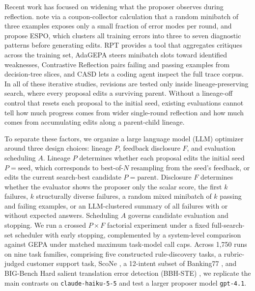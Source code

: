 \documentclass[10pt]{article}
\begin{document}
Recent work has focused on widening what the proposer observes during
reflection. \citet{liu2026espo} note via a coupon-collector calculation
that a random minibatch of three examples exposes only a small fraction
of error modes per round, and propose ESPO, which clusters all training
errors into three to seven diagnostic patterns before generating edits.
RPT \citep{bayat2026reflective} provides a tool that aggregates
critiques across the training set, AdaGEPA \citep{chen2026adagepa}
steers minibatch slots toward identified weaknesses, Contrastive
Reflection \citep{koh2026contrastive} pairs failing and passing examples
from decision-tree slices, and CASD \citep{singh2026coding} lets a
coding agent inspect the full trace corpus. In all of these iterative
studies, revisions are tested only inside lineage-preserving search,
where every proposal edits a surviving parent. Without a lineage-off
control that resets each proposal to the initial seed, existing
evaluations cannot tell how much progress comes from wider single-round
reflection and how much comes from accumulating edits along a
parent-child lineage.

To separate these factors, we organize a large language model (LLM)
optimizer around three design choices: lineage \(P\), feedback
disclosure \(F\), and evaluation scheduling \(A\). Lineage \(P\)
determines whether each proposal edits the initial seed
\(P = \text{seed}\), which corresponds to best-of-\(N\) resampling from
the seed's feedback, or edits the current search-best candidate
\(P = \text{parent}\). Disclosure \(F\) determines whether the evaluator
shows the proposer only the scalar score, the first \(k\) failures,
\(k\) structurally diverse failures, a random mixed minibatch of \(k\)
passing and failing examples, or an LLM-clustered summary of all
failures with or without expected answers. Scheduling \(A\) governs
candidate evaluation and stopping. We run a crossed \(P \times F\)
factorial experiment under a fixed full-search-set scheduler with early
stopping, complemented by a system-level comparison against GEPA under
matched maximum task-model call caps. Across 1,750 runs on nine task
families, comprising five constructed rule-discovery tasks, a
rubric-judged customer support task, ScoNe \citep{she2023scone}, a
12-intent subset of Banking77 \citep{casanueva2020efficient}, and
BIG-Bench Hard salient translation error detection (BBH-STE)
\citep{suzgun2022challenging}, we replicate the main contrasts on
\texttt{claude-haiku-5-5} and test a larger proposer model
\texttt{gpt-4.1}.
\end{document}
